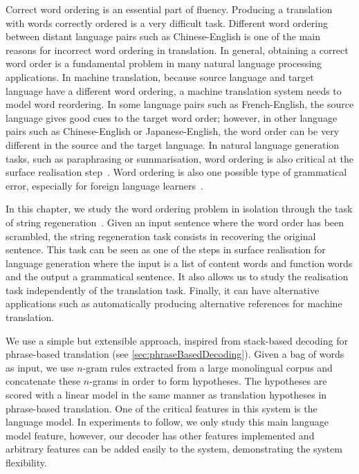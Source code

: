 Correct word ordering is an essential part of fluency.
Producing a translation with words correctly ordered is
a very difficult task.
Different word ordering between distant language pairs such as
Chinese-English is one of the main reasons for incorrect word ordering in translation.
In general, obtaining a correct word order is a fundamental problem in many natural language
processing applications.
In machine translation, because
source language and target language have a different word
ordering, a machine translation system needs to model word
reordering. In some language pairs such as French-English, the
source language gives good cues to the target word order; however,
in other language pairs such as Chinese-English or Japanese-English,
the word order can be very different in the source and
the target language. In natural language generation tasks, such
as paraphrasing or summarisation, word ordering
is also critical at the surface realisation
step~\citep{reiter-dale:1997:JNLE}.
Word ordering is also one possible type of grammatical
error, especially for foreign language
learners~\citep{yu-chen:2012:COLING}. %

In this chapter, we study the word ordering problem in
isolation through the task of
string regeneration~\citep{wan-dras-dale-paris:2009:EACL}.
Given an input sentence where the word order has
been scrambled, the string regeneration task consists in recovering
the original sentence. This task can be seen as one of the
steps in surface realisation for language generation where
the input is a list of content words and function words and
the output a grammatical sentence. It also allows us to study
the realisation task independently of the translation task.
Finally, it can have alternative applications such as
automatically producing alternative references for machine
translation.

We use a simple but extensible approach, inspired from
stack-based decoding for phrase-based
translation (see \autoref{sec:phraseBasedDecoding}).
Given a bag of words as input, we use $n$-gram rules
extracted from a large monolingual corpus and concatenate
these $n$-grams in order to form hypotheses. The hypotheses are scored
with a linear model in the same manner as translation
hypotheses in phrase-based translation.
One of the critical features in this system
is the language model. In experiments to follow, we only study
this main language model feature, however, our decoder has other features
implemented and
arbitrary features can be added easily to the
system, demonstrating the system flexibility.

